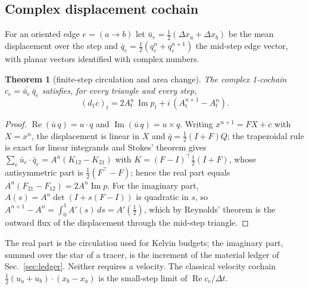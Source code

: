 \documentclass[11pt]{article}
\newtheorem{theorem}{Theorem}\newtheorem{proposition}{Proposition}\newtheorem{corollary}{Corollary}
\theoremstyle{definition}\newtheorem{definition}{Definition}\theoremstyle{remark}\newtheorem{remark}{Remark}
\newcommand{\im}{\operatorname{Im}}\newcommand{\re}{\operatorname{Re}}
\begin{document}
\subsection{Complex displacement cochain}
For an oriented edge $e=(a\to b)$ let $\bar u_e=\frac12(\Delta x_a+\Delta x_b)$ be the mean displacement over the step and $\bar q_e=\frac12(q_e^n+q_e^{n+1})$ the mid-step edge vector, with planar vectors identified with complex numbers.
\begin{theorem}[finite-step circulation and area change]\label{thm:cplx}
The complex 1-cochain $c_e=\overline{\bar u_e}\,\bar q_e$ satisfies, for every triangle and every step,
\begin{equation}
(d_1c)_t=2A_t^n\,\im p_t+i\,(A_t^{n+1}-A_t^n).
\end{equation}
\end{theorem}
\begin{proof}
$\re(\bar u\,q)=u\cdot q$ and $\im(\bar u\,q)=u\times q$. Writing $x^{n+1}=FX+c$ with $X=x^n$, the displacement is linear in $X$ and $\bar q=\frac12(I+F)Q$; the trapezoidal rule is exact for linear integrands and Stokes' theorem gives $\sum_e\bar u_e\cdot\bar q_e=A^n(K_{12}-K_{21})$ with $K=(F-I)^\top\frac12(I+F)$, whose antisymmetric part is $\frac12(F^\top-F)$; hence the real part equals $A^n(F_{21}-F_{12})=2A^n\im p$. For the imaginary part, $A(s)=A^n\det(I+s(F-I))$ is quadratic in $s$, so $A^{n+1}-A^n=\int_0^1A'(s)\,ds=A'(\frac12)$, which by Reynolds' theorem is the outward flux of the displacement through the mid-step triangle.
\end{proof}
The real part is the circulation used for Kelvin budgets; the imaginary part, summed over the star of a tracer, is the increment of the material ledger of Sec.~\ref{sec:ledger}. Neither requires a velocity. The classical velocity cochain $\frac12(u_a+u_b)\cdot(x_b-x_a)$ is the small-step limit of $\re c_e/\Delta t$.
\end{document}
